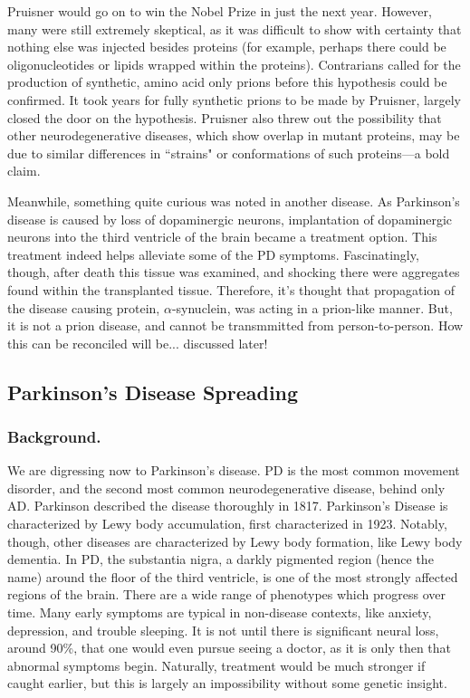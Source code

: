 Pruisner would go on to win the Nobel Prize in just the next year. However, many were still extremely skeptical, as it was difficult to show with certainty that nothing else was injected besides proteins (for example, perhaps there could be oligonucleotides or lipids wrapped within the proteins). Contrarians called for the production of synthetic, amino acid only prions before this hypothesis could be confirmed. It took years for fully synthetic prions to be made by Pruisner, largely closed the door on the hypothesis. Pruisner also threw out the possibility that other neurodegenerative diseases, which show overlap in mutant proteins, may be due to similar differences in ``strains" or conformations of such proteins---a bold claim.\newline

Meanwhile, something quite curious was noted in another disease. As Parkinson's disease is caused by loss of dopaminergic neurons,  implantation of dopaminergic neurons into the third ventricle of the brain became a treatment option. This treatment indeed helps alleviate some of the PD symptoms. Fascinatingly, though, after death this tissue was examined, and shocking there were aggregates found within the transplanted tissue. Therefore, it's thought that propagation of the disease causing protein, $\alpha$-synuclein, was acting in a prion-like manner. But, it is not a prion disease, and cannot be transmmitted from person-to-person. How this can be reconciled will be... discussed later!


\subsection*{Parkinson's Disease Spreading}

\subsubsection*{Background.}

\label{sec:PDDegeneration}

We are digressing now to Parkinson's disease. PD is the most common movement disorder, and the second most common neurodegenerative disease, behind only AD. Parkinson described the disease thoroughly in 1817. Parkinson's Disease is characterized by Lewy body accumulation, first characterized in 1923. Notably, though, other diseases are characterized by Lewy body formation, like Lewy body dementia. In PD, the substantia nigra, a darkly pigmented region (hence the name) around the floor of the third ventricle, is one of the most strongly affected regions of the brain. There are a wide range of phenotypes which progress over time. Many early symptoms are typical in non-disease contexts, like anxiety, depression, and trouble sleeping. It is not until there is significant neural loss, around 90\%, that one would even pursue seeing a doctor, as it is only then that abnormal symptoms begin. Naturally, treatment would be much stronger if caught earlier, but this is largely an impossibility without some genetic insight. \newline

